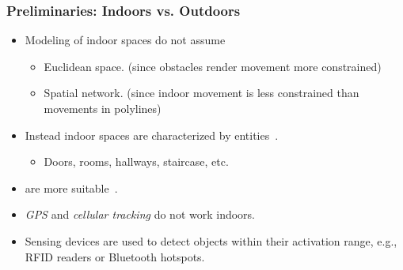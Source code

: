 \begin{frame}
\frametitle{Preliminaries: Indoors vs. Outdoors}

\begin{itemize}
  \item Modeling of indoor spaces do not assume~\cite{jensen2010indoor}
    \begin{itemize}
      \item Euclidean space. (since obstacles render movement more constrained)
      \item Spatial network. (since indoor movement is less constrained than movements in polylines)
    \end{itemize}

  \item Instead indoor spaces are characterized by entities~\cite{DBLP:conf/mdm/JensenLY09}.
    \begin{itemize}
      \item Doors, rooms, hallways, staircase, etc.
    \end{itemize}

  \item {} are more suitable~\cite{becker2005location}.

  \item \emph{GPS} and \emph{cellular tracking} do not work indoors.

  \item Sensing devices are used to detect objects within their activation range, e.g., RFID readers or Bluetooth hotspots.
\end{itemize}

\end{frame}


